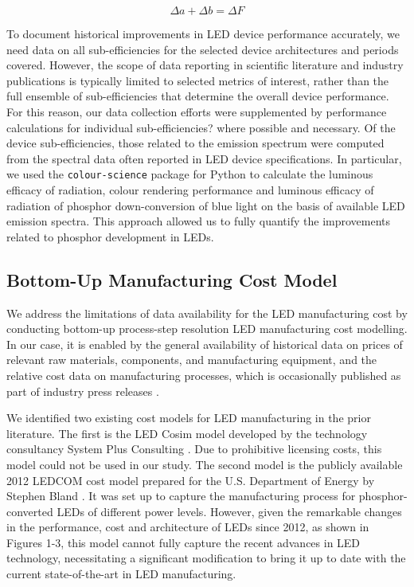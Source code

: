 \documentclass[twoside,twocolumn,9pt]{article}
\begin{document}
\begin{equation}
    \Delta a + \Delta b  = \Delta F
\end{equation}

To document historical improvements in LED device performance accurately, we need data on all sub-efficiencies for the selected device architectures and periods covered. However, the scope of data reporting in scientific literature and industry publications is typically limited to selected metrics of interest, rather than the full ensemble of sub-efficiencies that determine the overall device performance. For this reason, our data collection efforts were supplemented by performance calculations for individual sub-efficiencies? where possible and necessary. Of the device sub-efficiencies, those related to the emission spectrum  were computed from the spectral data often reported in LED device specifications. In particular, we used the \texttt{colour-science} package for Python\cite{python-colour} to calculate the luminous efficacy of radiation, colour rendering performance and luminous efficacy of radiation of phosphor down-conversion of blue light on the basis of available LED emission spectra. This approach allowed us to fully quantify the improvements related to phosphor development in LEDs. 

\subsection{Bottom-Up Manufacturing Cost Model}

We address the limitations of data availability for the LED manufacturing cost by conducting bottom-up process-step resolution LED manufacturing cost modelling. In our case, it is enabled by the general availability of historical data on prices of relevant raw materials, components, and manufacturing equipment, and the relative cost data on manufacturing processes, which is occasionally published as part of industry press releases \cite{ledinside2013csp}\cite{seoul2015csp}. 

We identified two existing cost models for LED manufacturing in the prior literature. The first is the LED Cosim model developed by the technology consultancy System Plus Consulting \cite{cosim2013} \cite{cosim2019}. Due to prohibitive licensing costs, this model could not be used in our study. The second model is the publicly available 2012 LEDCOM cost model prepared for the U.S. Department of Energy by Stephen Bland  \cite{ledcomv2}. It was set up to capture the manufacturing process for phosphor-converted LEDs of different power levels. However, given the remarkable changes in the performance, cost and architecture of LEDs since 2012, as shown in Figures 1-3, this model cannot fully capture the recent advances in LED technology, necessitating a significant modification to bring it up to date with the current state-of-the-art in LED manufacturing.   
\end{document}
